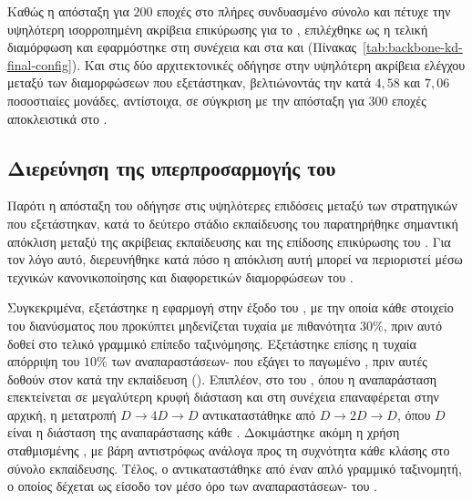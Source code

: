 Καθώς η απόσταξη για \(200\) εποχές στο πλήρες συνδυασμένο σύνολο
 και  πέτυχε την υψηλότερη ισορροπημένη ακρίβεια
επικύρωσης για το , επιλέχθηκε ως η τελική διαμόρφωση
και εφαρμόστηκε στη συνέχεια και στα  και 
(Πίνακας~\ref{tab:backbone-kd-final-config}). Και στις δύο
αρχιτεκτονικές οδήγησε στην υψηλότερη ακρίβεια ελέγχου μεταξύ των
διαμορφώσεων που εξετάστηκαν, βελτιώνοντάς την κατά \(4{,}58\) και
\(7{,}06\) ποσοστιαίες μονάδες, αντίστοιχα, σε σύγκριση με την απόσταξη
για \(300\) εποχές αποκλειστικά στο .

\subsection{Διερεύνηση της υπερπροσαρμογής του }
\label{subsec:backbone-kd-overfitting}

Παρότι η απόσταξη του  οδήγησε στις υψηλότερες επιδόσεις
μεταξύ των στρατηγικών που εξετάστηκαν, κατά το δεύτερο στάδιο εκπαίδευσης του 
παρατηρήθηκε σημαντική απόκλιση μεταξύ της ακρίβειας εκπαίδευσης και
της επίδοσης επικύρωσης του . Για τον λόγο αυτό, διερευνήθηκε κατά πόσο η απόκλιση αυτή μπορεί να
περιοριστεί μέσω τεχνικών κανονικοποίησης και διαφορετικών
διαμορφώσεων του .

Συγκεκριμένα, εξετάστηκε η εφαρμογή  στην έξοδο του
, με την οποία κάθε στοιχείο του διανύσματος που
προκύπτει μηδενίζεται τυχαία με πιθανότητα \(30\%\), πριν αυτό δοθεί
στο τελικό γραμμικό επίπεδο ταξινόμησης. Εξετάστηκε επίσης η τυχαία
απόρριψη του \(10\%\) των αναπαραστάσεων- που εξάγει το
παγωμένο , πριν αυτές δοθούν στον 
κατά την εκπαίδευση (). Επιπλέον, στο  του , όπου η αναπαράσταση
επεκτείνεται σε μεγαλύτερη κρυφή διάσταση και στη συνέχεια επαναφέρεται
στην αρχική, η μετατροπή \(D\rightarrow4D\rightarrow D\)
αντικαταστάθηκε από \(D\rightarrow2D\rightarrow D\), όπου \(D\) είναι η
διάσταση της αναπαράστασης κάθε . Δοκιμάστηκε ακόμη η χρήση σταθμισμένης
, με βάρη αντιστρόφως ανάλογα προς τη συχνότητα κάθε
κλάσης στο σύνολο εκπαίδευσης. Τέλος, ο  αντικαταστάθηκε από έναν απλό
γραμμικό ταξινομητή, ο οποίος δέχεται ως είσοδο τον μέσο όρο των
αναπαραστάσεων- του .


